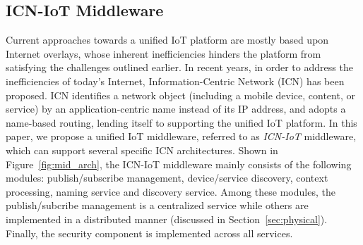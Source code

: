 \subsection{ICN-IoT Middleware}
Current approaches towards a unified IoT platform are mostly based upon Internet overlays, whose inherent inefficiencies hinders the platform from satisfying the challenges outlined earlier. In recent years, in order to address  the inefficiencies of today's Internet, Information-Centric Network (ICN) has been proposed. ICN identifies a network object (including a mobile device, content, or service) by an application-centric name instead of its IP address, and adopts a name-based routing, lending itself to supporting the unified IoT platform. In this paper, we propose a unified IoT middleware, referred to as \emph{ICN-IoT} middleware, which can support several specific ICN architectures. Shown in Figure~\ref{fig:mid_arch}, the ICN-IoT middleware mainly consists of the following modules: publish/subscribe management, device/service discovery, context processing, naming service and discovery service. Among these modules, the publish/subcribe management is a centralized service while others are implemented in a distributed manner (discussed in Section~\ref{sec:physical}). Finally, the security component is implemented across all services. 

